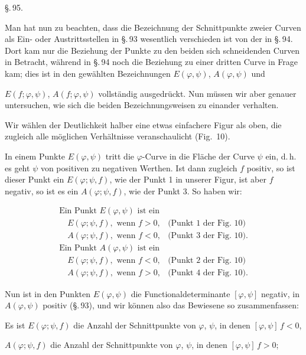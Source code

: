 \begin{center}
\S.\,95.

\end{center}

Man hat nun zu beachten, dass die Bezeichnung der Schnittpunkte
zweier Curven als Ein- oder Austrittsstellen in \S.\,93
wesentlich verschieden ist von der in \S.\,94. Dort kam nur
die Beziehung der Punkte zu den beiden sich schneidenden
Curven in Betracht, während in \S.\,94 noch die Beziehung zu
einer dritten Curve in Frage kam; dies ist in den gewählten
Bezeichnungen $E(\varphi, \psi)$, $A(\varphi, \psi)$ und


$E(f; \varphi, \psi)$, $A(f; \varphi, \psi)$ vollständig ausgedrückt. Nun müssen
wir aber genauer untersuchen, wie sich die beiden Bezeichnungsweisen
zu einander verhalten.

Wir wählen der Deutlichkeit halber eine etwas einfachere
Figur als oben, die zugleich alle möglichen Verhältnisse veranschaulicht
(Fig.~10).

In einem Punkte $E(\varphi, \psi)$ tritt die $\varphi$-Curve in die Fläche
der Curve $\psi$ ein, d.\,h. es geht $\psi$ von positiven zu negativen
Werthen. Ist dann zugleich $f$ positiv, so ist dieser Punkt ein
$E(\varphi; \psi, f)$, wie der Punkt 1 in unserer Figur, ist aber $f$ negativ,
so ist es ein $A(\varphi; \psi, f)$, wie der Punkt 3. So haben wir:

\[
\begin{array}{ll}
\text{Ein Punkt } E(\varphi, \psi) \text{ ist ein} & \\
\quad E(\varphi; \psi, f), \text{ wenn } f > 0, & \text{(Punkt 1 der Fig. 10)} \\
\quad A(\varphi; \psi, f), \text{ wenn } f < 0, & \text{(Punkt 3 der Fig. 10).} \\
\text{Ein Punkt } A(\varphi, \psi) \text{ ist ein} & \\
\quad E(\varphi; \psi, f), \text{ wenn } f < 0, & \text{(Punkt 2 der Fig. 10)} \\
\quad A(\varphi; \psi, f), \text{ wenn } f > 0, & \text{(Punkt 4 der Fig. 10).}
\end{array}
\]

Nun ist in den Punkten $E(\varphi, \psi)$ die Functionaldeterminante
$[\varphi, \psi]$ negativ, in $A(\varphi, \psi)$ positiv (\S.\,93), und wir können
also das Bewiesene so zusammenfassen:

Es ist $E(\varphi; \psi, f)$ die Anzahl der Schnittpunkte von $\varphi$, $\psi$, in
denen $[\varphi, \psi]\, f < 0$,

$A(\varphi; \psi, f)$ die Anzahl der Schnittpunkte von $\varphi$, $\psi$, in
denen $[\varphi, \psi]\, f > 0$;
